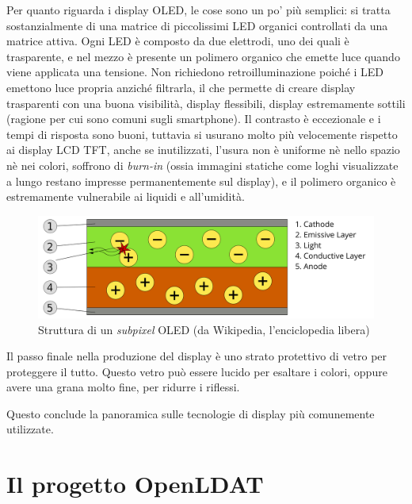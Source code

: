 Per quanto riguarda i display OLED, le cose sono un po' più semplici: si tratta sostanzialmente di una matrice di piccolissimi LED organici controllati da una matrice attiva. Ogni LED è composto da due elettrodi, uno dei quali è trasparente, e nel mezzo è presente un polimero organico che emette luce quando viene applicata una tensione. Non richiedono retroilluminazione poiché i LED emettono luce propria anziché filtrarla, il che permette di creare display trasparenti con una buona visibilità, display flessibili, display estremamente sottili (ragione per cui sono comuni sugli smartphone). Il contrasto è eccezionale e i tempi di risposta sono buoni, tuttavia si usurano molto più velocemente rispetto ai display LCD TFT, anche se inutilizzati, l'usura non è uniforme nè nello spazio nè nei colori, soffrono di \textit{burn-in} (ossia immagini statiche come loghi visualizzate a lungo restano impresse permanentemente sul display), e il polimero organico è estremamente vulnerabile ai liquidi e all'umidità.

\begin{figure}[h]
	\centering
	\includegraphics[width=\textwidth]{Introduzione_files/oled.png}
	\caption{Struttura di un \textit{subpixel} OLED (da Wikipedia, l'enciclopedia libera)}
	\label{fig:oled}
\end{figure}

Il passo finale nella produzione del display è uno strato protettivo di vetro per proteggere il tutto. Questo vetro può essere lucido per esaltare i colori, oppure avere una grana molto fine, per ridurre i riflessi.

Questo conclude la panoramica sulle tecnologie di display più comunemente utilizzate.

\section{Il progetto OpenLDAT}
